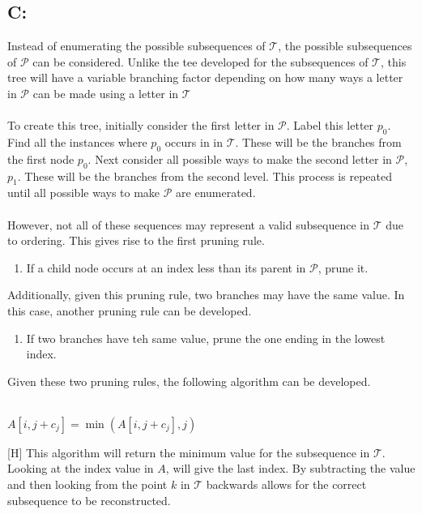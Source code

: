 \documentclass[12pt]{article}
\begin{document}
\subsection*{C:}
Instead of enumerating the possible subsequences of $\mathcal{T}$, the
possible subsequences of $\mathcal{P}$ can be considered.  Unlike
the tee developed for the subsequences of $\mathcal{T}$, this tree
will have a variable branching factor depending on how many ways a 
letter in $\mathcal{P}$ can be made using a letter in $\mathcal{T}$\\\\
To create this tree, initially consider the first letter in $\mathcal{P}$. 
Label this letter $p_0$.  Find all the instances where $p_0$ occurs in
in $\mathcal{T}$.  These will be the branches from the first node $p_0$.
Next consider all possible ways to make the second letter in $\mathcal{P}$,
$p_1$.  These will be the branches from the second level.  This process
is repeated until all possible ways to make $\mathcal{P}$ are enumerated.\\\\
However, not all of these sequences may represent a valid subsequence in
$\mathcal{T}$ due to ordering.  This gives rise to the first pruning rule.
\begin{enumerate}
\item If a child node occurs at an index less than its parent in $\mathcal{P}$,
      prune it.
\end{enumerate}
Additionally, given this pruning rule, two branches may have the same value.  In
this case, another pruning rule can be developed.
\begin{enumerate}
\item If two branches have teh same value, prune the one ending in the lowest index.
\end{enumerate}
Given these two pruning rules, the following algorithm can be developed.
\begin{algorithm}[H]
\\
{
    {
        {
            $A[i,j+c_j]=\min(A[i,j+c_j], j)$
        }
    }
}
\end{algorithm}[H]
This algorithm will return the minimum value for the subsequence in $\mathcal{T}$.
Looking at the index value in $A$, will give the last index.  By subtracting the value
and then looking from the point $k$ in $\mathcal{T}$ backwards allows for the correct
subsequence to be reconstructed.         
\end{document}
